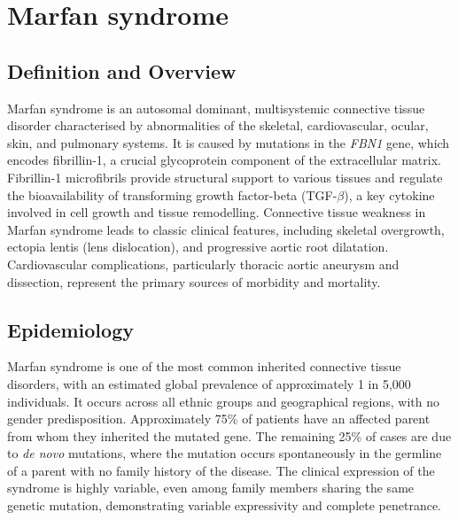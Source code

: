 \chapter{Marfan syndrome}

\section*{Definition and Overview}
Marfan syndrome is an autosomal dominant, multisystemic connective tissue disorder characterised by abnormalities of the skeletal, cardiovascular, ocular, skin, and pulmonary systems. It is caused by mutations in the \textit{FBN1} gene, which encodes fibrillin-1, a crucial glycoprotein component of the extracellular matrix. Fibrillin-1 microfibrils provide structural support to various tissues and regulate the bioavailability of transforming growth factor-beta (TGF-$\beta$), a key cytokine involved in cell growth and tissue remodelling. Connective tissue weakness in Marfan syndrome leads to classic clinical features, including skeletal overgrowth, ectopia lentis (lens dislocation), and progressive aortic root dilatation. Cardiovascular complications, particularly thoracic aortic aneurysm and dissection, represent the primary sources of morbidity and mortality.

\section*{Epidemiology}
Marfan syndrome is one of the most common inherited connective tissue disorders, with an estimated global prevalence of approximately 1 in 5,000 individuals. It occurs across all ethnic groups and geographical regions, with no gender predisposition. Approximately 75\% of patients have an affected parent from whom they inherited the mutated gene. The remaining 25\% of cases are due to \textit{de novo} mutations, where the mutation occurs spontaneously in the germline of a parent with no family history of the disease. The clinical expression of the syndrome is highly variable, even among family members sharing the same genetic mutation, demonstrating variable expressivity and complete penetrance.

